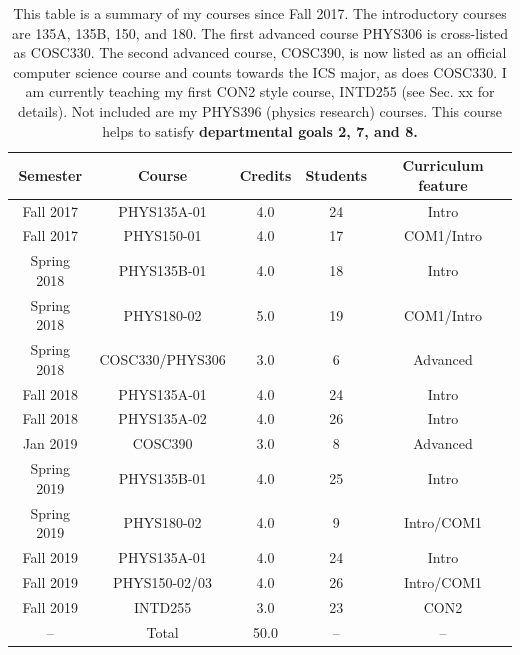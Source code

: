 \documentclass[../../../main.tex]{subfiles}
\begin{document}
\begin{table}
\centering
\begin{tabular}{| c | c | c | c | c |}
\hline \hline
Semester & Course & Credits & Students & Curriculum feature \\ \hline
Fall 2017 & PHYS135A-01 & 4.0 & 24 & Intro \\ \hline
Fall 2017 & PHYS150-01 & 4.0 & 17 & COM1/Intro \\ \hline
Spring 2018 & PHYS135B-01 & 4.0 & 18 & Intro \\ \hline
Spring 2018 & PHYS180-02 & 5.0 & 19 & COM1/Intro \\ \hline
Spring 2018 & COSC330/PHYS306 & 3.0 & 6 & Advanced \\ \hline
Fall 2018 & PHYS135A-01 & 4.0 & 24 & Intro \\ \hline
Fall 2018 & PHYS135A-02 & 4.0 & 26 & Intro \\ \hline
Jan 2019 & COSC390 & 3.0 & 8 & Advanced \\ \hline
Spring 2019 & PHYS135B-01 & 4.0 & 25 & Intro \\ \hline
Spring 2019 & PHYS180-02 & 4.0 & 9 & Intro/COM1 \\ \hline
Fall 2019 & PHYS135A-01 & 4.0 & 24 & Intro \\ \hline
Fall 2019 & PHYS150-02/03 & 4.0 & 26 & Intro/COM1 \\ \hline
Fall 2019 & INTD255 & 3.0 & 23 & CON2 \\ \hline
-- & Total & 50.0 & -- & -- \\ \hline
\hline
\end{tabular}
\caption{\label{tab:courses:teaching} This table is a summary of my courses since Fall 2017.  The introductory courses are 135A, 135B, 150, and 180.  The first advanced course PHYS306 is cross-listed as COSC330. The second advanced course, COSC390, is now listed as an official computer science course and counts towards the ICS major, as does COSC330.  I am currently teaching my first CON2 style course, INTD255 (see Sec. xx for details). Not included are my PHYS396 (physics research) courses.  This course helps to satisfy \textbf{departmental goals 2, 7, and 8.}}
\end{table}
\end{document}
